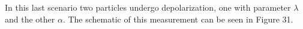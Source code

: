 \documentclass[twocolumn]{article}
\begin{document}
In this last scenario two particles undergo depolarization, one with parameter $\lambda$ and the other $\alpha$. The schematic of this measurement can be seen in Figure 31.
\begin{figure}[ht]
    \centering
\end{figure}
\end{document}

